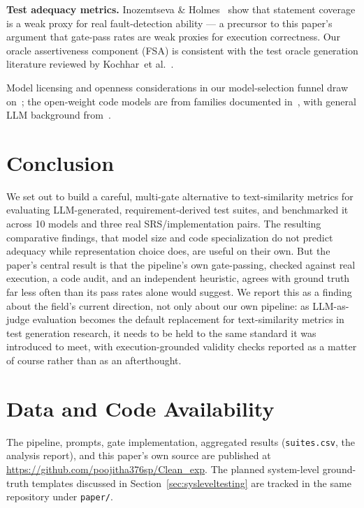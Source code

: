 \documentclass[conference]{IEEEtran}
\newcommand{\etal}{et al.}
\begin{document}
{  \textbf{Test adequacy metrics.}
  Inozemtseva \& Holmes~\cite{inozemtseva2014coverage} show that statement
  coverage is a weak proxy for real fault-detection ability — a precursor to
  this paper's argument that gate-pass rates are weak proxies for execution
  correctness. Our oracle assertiveness component (FSA) is consistent with
  the test oracle generation literature reviewed by
  Kochhar~\etal~\cite{kochhar2015oracle}.

  Model licensing and openness considerations in our model-selection funnel
  draw on~\cite{luccioni2023openness}; the open-weight code models are from
  families documented in~\cite{li2023starcoder,deepseek2024coderv2}, with
  general LLM background from~\cite{ouyang2022instructgpt}.
  }
  \section{Conclusion}

  We set out to build a careful, multi-gate alternative to text-similarity
  metrics for evaluating LLM-generated, requirement-derived test suites, and
  benchmarked it across 10 models and three real SRS/implementation pairs. The
  resulting comparative findings, that model size and code specialization do
  not predict adequacy while representation choice does, are useful on their
  own. But the paper's central result is that the pipeline's own gate-passing,
  checked against real execution, a code audit, and an independent heuristic,
  agrees with ground truth far less often than its pass rates alone would
  suggest. We report this as a finding about the field's current direction, not
  only about our own pipeline: as LLM-as-judge evaluation becomes the default
  replacement for text-similarity metrics in test generation research, it needs
  to be held to the same standard it was introduced to meet, with
  execution-grounded validity checks reported as a matter of course rather than
  as an afterthought.



  \section*{Data and Code Availability}
  The pipeline, prompts, gate implementation, aggregated results
  (\texttt{suites.csv}, the analysis report), and this paper's own source are
  published at \url{https://github.com/poojitha376sp/Clean_exp}. The planned
  system-level ground-truth templates discussed in
  Section~\ref{sec:sysleveltesting} are tracked in the same repository under
  \texttt{paper/}.

  
  

  
\end{document}
